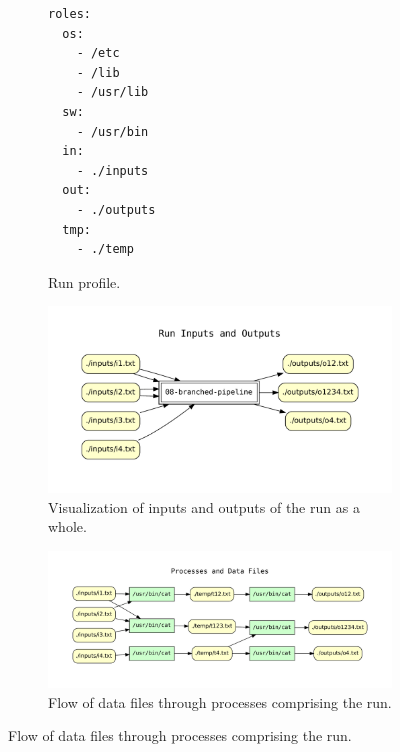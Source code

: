 \begin{figure}[th]
        \centering
\begin{subfigure}[c]{0.20\linewidth}
\begin{verbatim}
roles:
  os:
    - /etc
    - /lib
    - /usr/lib
  sw:
    - /usr/bin
  in:
    - ./inputs
  out:
    - ./outputs
  tmp:
    - ./temp
\end{verbatim}
            \caption{Run profile.}
        \end{subfigure}
\hfill
        \begin{subfigure}[c]{0.69\linewidth}
          \centering
            \includegraphics[width=0.92\linewidth]{cpr_run_inputs_outputs.pdf}
            \caption{Visualization of inputs and outputs of the run as a whole.}
        \end{subfigure} 

\vspace*{1em}
\centering 
    \begin{subfigure}[b]{0.9\linewidth}
        \includegraphics[width=1.0\linewidth]{cpr_processes_and_data_files.pdf}
        \caption{Flow of data files through processes comprising the run.}
    \end{subfigure}
    \label{fig:cpr-example}
\end{figure}





